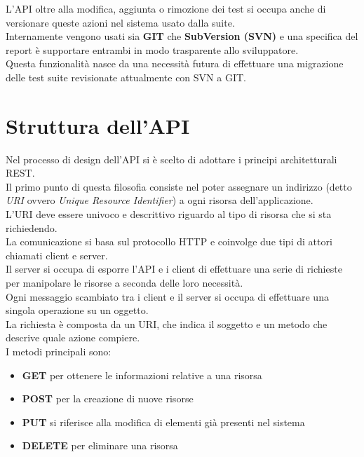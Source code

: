        L'API oltre alla modifica, aggiunta o rimozione dei test si occupa anche di versionare queste azioni nel sistema usato dalla suite.\\
        Internamente vengono usati sia \textbf{GIT} che \textbf{SubVersion (SVN)} e una specifica del report è supportare entrambi in modo trasparente allo sviluppatore.\\
        Questa funzionalità nasce da una necessità futura di effettuare una migrazione delle test suite revisionate attualmente con SVN a GIT.\\
            
    \section{Struttura dell'API}
        Nel processo di design dell'API si è scelto di adottare i principi architetturali REST.\\
        Il primo punto di questa filosofia consiste nel poter assegnare un indirizzo (detto \textit{URI} ovvero \textit{Unique Resource Identifier}) a ogni risorsa dell'applicazione.\\
        L'URI deve essere univoco e descrittivo riguardo al tipo di risorsa che si sta richiedendo.\\
        La comunicazione si basa sul protocollo HTTP e coinvolge due tipi di attori chiamati client e server.\\
        Il server si occupa di esporre l'API e i client di effettuare una serie di richieste per manipolare le risorse a seconda delle loro necessità.\\
        Ogni messaggio scambiato tra i client e il server si occupa di effettuare una singola operazione su un oggetto.\\
        La richiesta è composta da un URI, che  indica il soggetto e un metodo che descrive quale azione compiere.\\
        I metodi principali sono:
        
        \begin{itemize}
            \item \textbf{GET} per ottenere le informazioni relative a una risorsa
            \item \textbf{POST} per la creazione di nuove risorse

            \item \textbf{PUT} si riferisce alla modifica di elementi già presenti nel sistema
            \item \textbf{DELETE} per eliminare una risorsa
        \end{itemize}
        
